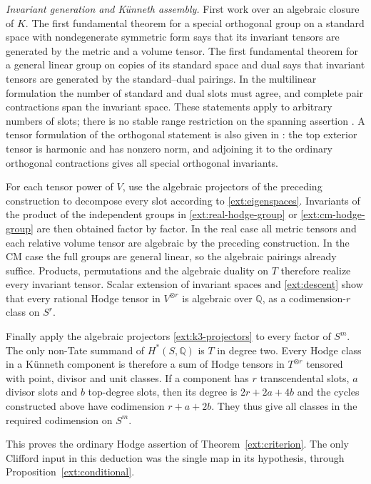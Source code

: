 \documentclass[11pt]{amsart}
\newcommand{\Q}{\mathbb Q}
\theoremstyle{definition}
\theoremstyle{remark}
\numberwithin{equation}{section}
\begin{document}
\emph{Invariant generation and K\"unneth assembly.}
First work over an algebraic closure of $K$.  The first
fundamental theorem for a special orthogonal group on a standard
space with nondegenerate symmetric form says that its invariant
tensors are generated by the metric and a volume tensor.  The
first fundamental theorem for a general linear group on copies of
its standard space and dual says that invariant tensors are
generated by the standard--dual pairings.  In the multilinear
formulation the number of standard and dual slots must agree,
and complete pair contractions span the invariant space.  These
statements apply to arbitrary numbers of slots; there is no stable
range restriction on the spanning assertion
\cite[Sections~4.2 and 10.2]{KraftProcesi}.  A tensor formulation of
the orthogonal statement is also given in
\cite[Theorem~2.1, Remark~2.2 and Corollary~4.2]{LehrerZhangSO}:
the top exterior tensor is harmonic and has nonzero norm, and
adjoining it to the ordinary orthogonal contractions gives all
special orthogonal invariants.

For each tensor power of $V$, use the algebraic projectors of
the preceding construction to decompose every slot
according to \eqref{ext:eigenspaces}.  Invariants of the product
of the independent groups in
\eqref{ext:real-hodge-group} or \eqref{ext:cm-hodge-group} are then
obtained factor by factor.  In the real case all metric tensors
and each relative volume tensor are algebraic by
the preceding construction.  In the CM case the
full groups are general linear, so the algebraic pairings already
suffice.  Products, permutations and the algebraic duality on
$T$ therefore realize every invariant tensor.  Scalar extension
of invariant spaces and \eqref{ext:descent} show that every
rational Hodge tensor in $V^{\otimes r}$ is algebraic over $\Q$,
as a codimension-$r$ class on $S^r$.

Finally apply the algebraic projectors
\eqref{ext:k3-projectors} to every factor of $S^m$.  The only
non-Tate summand of $H^*(S,\Q)$ is $T$ in degree two.  Every Hodge
class in a K\"unneth component is therefore a sum of Hodge tensors
in $T^{\otimes r}$ tensored with point, divisor and unit classes.
If a component has $r$ transcendental slots, $a$ divisor slots
and $b$ top-degree slots, then its degree is
$2r+2a+4b$ and the cycles constructed above have codimension
$r+a+2b$.  They thus give all classes in the required codimension
on $S^m$.


This proves the ordinary Hodge assertion of Theorem~\ref{ext:criterion}.
The only Clifford input in this deduction was the single map in its
hypothesis, through Proposition~\ref{ext:conditional}.
\end{document}
